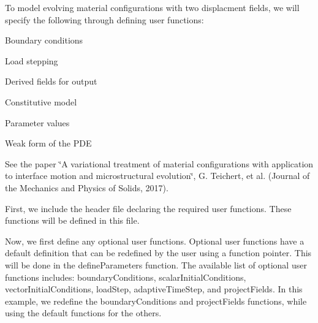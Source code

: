 

To model evolving material configurations with two displacment fields, we will specify the following through defining user functions\-: \par

\begin{DoxyItemize}
\item Boundary conditions \par

\item Load stepping \par

\item Derived fields for output \par

\item Constitutive model \par

\item Parameter values \par

\item Weak form of the P\-D\-E \par

\end{DoxyItemize}

See the paper \char`\"{}\-A variational treatment of material configurations with application to interface motion and microstructural evolution\char`\"{}, G. Teichert, et al. (Journal of the Mechanics and Physics of Solids, 2017).

First, we include the header file declaring the required user functions. These functions will be defined in this file.


\begin{DoxyCodeInclude}

\end{DoxyCodeInclude}


Now, we first define any optional user functions. Optional user functions have a default definition that can be redefined by the user using a function pointer. This will be done in the {\ttfamily define\-Parameters} function. The available list of optional user functions includes\-: {\ttfamily boundary\-Conditions}, {\ttfamily scalar\-Initial\-Conditions}, {\ttfamily vector\-Initial\-Conditions}, {\ttfamily load\-Step}, {\ttfamily adaptive\-Time\-Step}, and {\ttfamily project\-Fields}. In this example, we redefine the {\ttfamily boundary\-Conditions} and {\ttfamily project\-Fields} functions, while using the default functions for the others.

